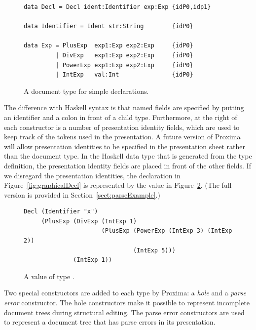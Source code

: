 \documentclass[12pt]{article}
\begin{document}
\begin{figure}
\begin{center}
\begin{footnotesize}
\begin{verbatim}
data Decl = Decl ident:Identifier exp:Exp {idP0,idp1}

data Identifier = Ident str:String        {idP0}

data Exp = PlusExp  exp1:Exp exp2:Exp     {idP0}
         | DivExp   exp1:Exp exp2:Exp     {idP0}
         | PowerExp exp1:Exp exp2:Exp     {idP0}
         | IntExp   val:Int               {idP0}
\end{verbatim}
\end{footnotesize}
\end{center}
\caption{A document type for simple declarations.} \label{fig:docType} 
\end{figure}

The difference with Haskell syntax is that named fields are specified by putting an identifier and a colon in front of a child type. Furthermore, at the right of each constructor is a number of presentation identity fields, which are used to keep track of the tokens used in the presentation. A future version of Proxima will allow presentation identities to be specified in the presentation sheet rather than the document type. In the Haskell data type that is generated from the type definition, the presentation identity fields are placed in front of the other fields. If we disregard the presentation identities, the declaration in Figure~\ref{fig:graphicalDecl} is represented by the value in Figure~\ref{fig:valueExample}. (The full version is provided in Section~\ref{sect:parseExample}.)

\begin{figure}
\begin{center}
\begin{footnotesize}
\begin{verbatim}
Decl (Identifier "x") 
     (PlusExp (DivExp (IntExp 1)
                      (PlusExp (PowerExp (IntExp 3) (IntExp 2))
                               (IntExp 5)))
              (IntExp 1))
\end{verbatim}
\end{footnotesize}
\end{center}
\caption{A value of type .} \label{fig:valueExample} 
\end{figure}


Two special constructors are added to each type by Proxima: a {\em hole} and a {\em parse error} constructor. The hole constructors make it possible to represent incomplete document trees during structural editing. The parse error constructors are used to represent a document tree that has parse errors in its presentation.
\end{document}
